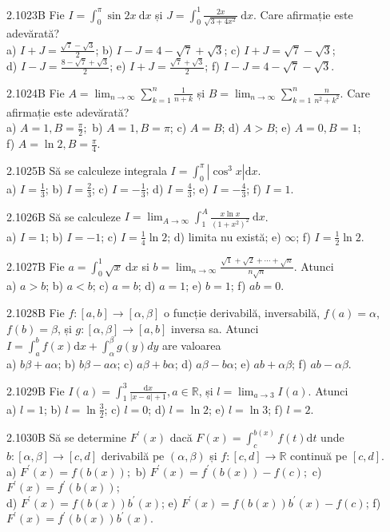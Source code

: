 \documentclass[11pt]{article}
\begin{document}
2.1023B Fie $I=\int_{0}^{\pi} \sin 2 x \mathrm{~d} x$ și $J=\int_{0}^{1} \frac{2 x}{\sqrt{3+4 x^{2}}} \mathrm{~d} x$. Care afirmație este adevărată?\\ a) $I+J=\frac{\sqrt{7}-\sqrt{3}}{2}$; b) $I-J=4-\sqrt{7}+\sqrt{3}$; c) $I+J=\sqrt{7}-\sqrt{3}$;\\ d) $I-J=\frac{8-\sqrt{7}+\sqrt{3}}{2}$; e) $I+J=\frac{\sqrt{7}+\sqrt{3}}{2}$; f) $I-J=4-\sqrt{7}-\sqrt{3}$.

2.1024B Fie $A=\lim _{n \rightarrow \infty} \sum_{k=1}^{n} \frac{1}{n+k}$ și $B=\lim _{n \rightarrow \infty} \sum_{k=1}^{n} \frac{n}{n^{2}+k^{2}}$. Care afirmație este adevărată?\\ a) $A=1, B=\frac{\pi}{2} ;$ b) $A=1, B=\pi$; c) $A=B$; d) $A>B$; e) $A=0, B=1$;\\ f) $A=\ln 2, B=\frac{\pi}{4}$.

2.1025B Să se calculeze integrala $I=\int_{0}^{\pi}\left|\cos ^{3} x\right| \mathrm{d} x$.\\ a) $I=\frac{1}{3}$; b) $I=\frac{2}{3}$; c) $I=-\frac{1}{3}$; d) $I=\frac{4}{3}$; e) $I=-\frac{4}{3}$; f) $I=1$.

2.1026B Să se calculeze $I=\lim _{A \rightarrow \infty} \int_{1}^{A} \frac{x \ln x}{\left(1+x^{2}\right)^{2}} \mathrm{~d} x$.\\ a) $I=1$; b) $I=-1$; c) $I=\frac{1}{4} \ln 2$; d) limita nu există; e) $\infty$; f) $I=\frac{1}{2} \ln 2$.

2.1027B Fie $a=\int_{0}^{1} \sqrt{x} \mathrm{~d} x$ si $b=\lim _{n \rightarrow \infty} \frac{\sqrt{1}+\sqrt{2}+\cdots+\sqrt{n}}{n \sqrt{n}}$. Atunci\\ a) $a>b$; b) $a<b$; c) $a=b$; d) $a=1$; e) $b=1$; f) $a b=0$.

2.1028B Fie $f:[a, b] \rightarrow[\alpha, \beta]$ o funcție derivabilă, inversabilă, $f(a)=\alpha$, $f(b)=\beta$, și $g:[\alpha, \beta] \rightarrow[a, b]$ inversa sa. Atunci $I=\int_{a}^{b} f(x) \mathrm{d} x+\int_{\alpha}^{\beta} g(y) d y$ are valoarea\\ a) $b \beta+a \alpha$; b) $b \beta-a \alpha$; c) $a \beta+b \alpha$; d) $a \beta-b \alpha$; e) $a b+\alpha \beta$; f) $a b-\alpha \beta$.

2.1029B Fie $I(a)=\int_{1}^{3} \frac{\mathrm{d} x}{|x-a|+1}, a \in \mathbb{R}$, și $l=\lim _{a \rightarrow 3} I(a)$. Atunci\\ a) $l=1$; b) $l=\ln \frac{3}{2}$; c) $l=0$; d) $l=\ln 2$; e) $l=\ln 3$; f) $l=2$.

2.1030B Să se determine $F^{\prime}(x)$ dacă $F(x)=\int_{c}^{b(x)} f(t) \mathrm{d} t$ unde $b:[\alpha, \beta] \rightarrow[c, d]$ derivabilă pe $(\alpha, \beta)$ și $f:[c, d] \rightarrow \mathbb{R}$ continuă pe $[c, d]$.\\ a) $F^{\prime}(x)=f(b(x)) ;$ b) $F^{\prime}(x)=f^{\prime}(b(x))-f(c) ;$ c) $F^{\prime}(x)=f^{\prime}(b(x))$;\\ d) $F^{\prime}(x)=f(b(x)) b^{\prime}(x)$; e) $F^{\prime}(x)=f(b(x)) b^{\prime}(x)-f(c)$; f) $F^{\prime}(x)=f^{\prime}(b(x)) b^{\prime}(x)$.
\end{document}
